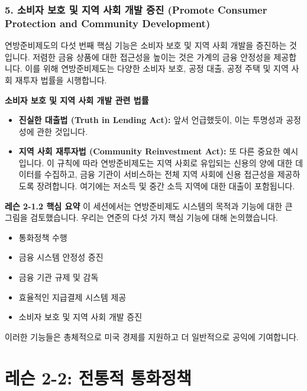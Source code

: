 \documentclass[11pt,a4paper]{article}
\begin{document}
\subsubsection*{5. 소비자 보호 및 지역 사회 개발 증진 (Promote Consumer Protection and Community Development)}
연방준비제도의 다섯 번째 핵심 기능은 소비자 보호 및 지역 사회 개발을 증진하는 것입니다. 저렴한 금융 상품에 대한 접근성을 높이는 것은 가계의 금융 안정성을 제공합니다. 이를 위해 연방준비제도는 다양한 소비자 보호, 공정 대출, 공정 주택 및 지역 사회 재투자 법률을 시행합니다.

\begin{examplebox}
\textbf{소비자 보호 및 지역 사회 개발 관련 법률}
\begin{itemize}
    \item \textbf{진실한 대출법 (Truth in Lending Act):} 앞서 언급했듯이, 이는 투명성과 공정성에 관한 것입니다.
    \item \textbf{지역 사회 재투자법 (Community Reinvestment Act):} 또 다른 중요한 예시입니다. 이 규칙에 따라 연방준비제도는 지역 사회로 유입되는 신용의 양에 대한 데이터를 수집하고, 금융 기관이 서비스하는 전체 지역 사회에 신용 접근성을 제공하도록 장려합니다. 여기에는 저소득 및 중간 소득 지역에 대한 대출이 포함됩니다.
\end{itemize}
\end{examplebox}

\begin{summarybox}
\textbf{레슨 2-1.2 핵심 요약}
이 세션에서는 연방준비제도 시스템의 목적과 기능에 대한 큰 그림을 검토했습니다. 우리는 연준의 다섯 가지 핵심 기능에 대해 논의했습니다.
\begin{itemize}
    \item 통화정책 수행
    \item 금융 시스템 안정성 증진
    \item 금융 기관 규제 및 감독
    \item 효율적인 지급결제 시스템 제공
    \item 소비자 보호 및 지역 사회 개발 증진
\end{itemize}
이러한 기능들은 총체적으로 미국 경제를 지원하고 더 일반적으로 공익에 기여합니다.
\end{summarybox}

\newpage
\section{레슨 2-2: 전통적 통화정책}
\end{document}

